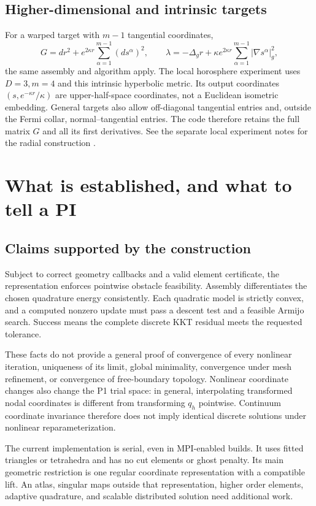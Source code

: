 \documentclass[11pt,a4paper]{article}
\begin{document}
\subsection{Higher-dimensional and intrinsic targets}
For a warped target with \(m-1\) tangential coordinates,
\begin{equation}
 G=dr^2+e^{2\kappa r}\sum_{\alpha=1}^{m-1}(ds^\alpha)^2,
 \qquad
 \lambda=-\Delta_g r+\kappa e^{2\kappa r}
 \sum_{\alpha=1}^{m-1}|\nabla s^\alpha|_g^2,
\end{equation}
the same assembly and algorithm apply. The local horosphere experiment
uses \(D=3,m=4\) and this intrinsic hyperbolic metric. Its output
coordinates \((s,e^{-\kappa r}/\kappa)\) are upper-half-space coordinates,
not a Euclidean isometric embedding. General targets also allow
off-diagonal tangential entries and, outside the Fermi collar,
normal--tangential entries. The code therefore retains the full matrix
\(G\) and all its first derivatives. See the separate local experiment
notes for the radial construction \cite{horosphere}.

\section{What is established, and what to tell a PI}
\label{sec:discussion}

\subsection{Claims supported by the construction}
Subject to correct geometry callbacks and a valid element certificate,
the representation enforces pointwise obstacle feasibility. Assembly
differentiates the chosen quadrature energy consistently. Each quadratic
model is strictly convex, and a computed nonzero update must pass a descent
test and a feasible Armijo search. Success means the complete discrete KKT
residual meets the requested tolerance.

These facts do not provide a general proof of convergence of every nonlinear
iteration, uniqueness of its limit, global minimality, convergence under mesh
refinement, or convergence of free-boundary topology. Nonlinear coordinate
changes also change the P1 trial space: in general, interpolating transformed
nodal coordinates is different from transforming \(q_h\) pointwise.
Continuum coordinate invariance therefore does not imply identical discrete
solutions under nonlinear reparameterization.

The current implementation is serial, even in MPI-enabled builds. It uses
fitted triangles or tetrahedra and has no cut elements or ghost penalty.
Its main geometric restriction is one regular coordinate representation
with a compatible lift. An atlas, singular maps outside that representation,
higher order elements, adaptive quadrature, and scalable distributed
solution need additional work.
\end{document}

